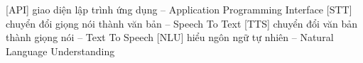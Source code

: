  [API]   {giao diện lập trình ứng dụng -- Application Programming Interface}
 [STT]   {chuyển đổi giọng nói thành văn bản -- Speech To Text}
 [TTS]   {chuyển đổi văn bản thành giọng nói -- Text To Speech}
 [NLU]   {hiểu ngôn ngữ tự nhiên -- Natural Language Understanding}